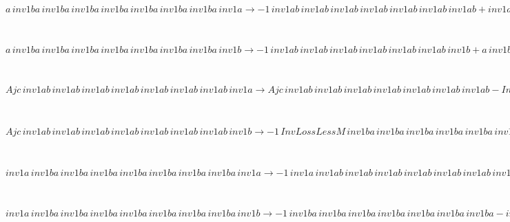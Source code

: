 \documentclass[rep10,leqno]{report}
\begin{document}
\begin{minipage}{6in}
$
a\,
 inv1ba\,
 inv1ba\,
 inv1ba\,
 inv1ba\,
 inv1ba\,
 inv1ba\,
 inv1ba\,
 inv1a\rightarrow -1\,
 inv1ab\,
 inv1ab\,
 inv1ab\,
 inv1ab\,
 inv1ab\,
 inv1ab\,
 inv1ab + inv1ab\,
 inv1ab\,
 inv1ab\,
 inv1ab\,
 inv1ab\,
 inv1ab\,
 inv1ab\,
 inv1a
$
\end{minipage}\medskip \\
\begin{minipage}{6in}
$
a\,
 inv1ba\,
 inv1ba\,
 inv1ba\,
 inv1ba\,
 inv1ba\,
 inv1ba\,
 inv1ba\,
 inv1b\rightarrow -1\,
 inv1ab\,
 inv1ab\,
 inv1ab\,
 inv1ab\,
 inv1ab\,
 inv1ab\,
 inv1b + a\,
 inv1ba\,
 inv1ba\,
 inv1ba\,
 inv1ba\,
 inv1ba\,
 inv1ba\,
 inv1ba + inv1ab\,
 inv1ab\,
 inv1ab\,
 inv1ab\,
 inv1ab\,
 inv1ab\,
 inv1ab\,
 inv1b
$
\end{minipage}\medskip \\
\begin{minipage}{6in}
$
Ajc\,
 inv1ab\,
 inv1ab\,
 inv1ab\,
 inv1ab\,
 inv1ab\,
 inv1ab\,
 inv1ab\,
 inv1a\rightarrow Ajc\,
 inv1ab\,
 inv1ab\,
 inv1ab\,
 inv1ab\,
 inv1ab\,
 inv1ab\,
 inv1ab - InvLossLessM\,
 inv1ba\,
 inv1ba\,
 inv1ba\,
 inv1ba\,
 inv1ba\,
 inv1ba\,
 inv1a + InvLossLessM\,
 inv1ba\,
 inv1ba\,
 inv1ba\,
 inv1ba\,
 inv1ba\,
 inv1ba\,
 inv1ba\,
 inv1a
$
\end{minipage}\medskip \\
\begin{minipage}{6in}
$
Ajc\,
 inv1ab\,
 inv1ab\,
 inv1ab\,
 inv1ab\,
 inv1ab\,
 inv1ab\,
 inv1ab\,
 inv1b\rightarrow -1\,
 InvLossLessM\,
 inv1ba\,
 inv1ba\,
 inv1ba\,
 inv1ba\,
 inv1ba\,
 inv1ba\,
 inv1ba + InvLossLessM\,
 inv1ba\,
 inv1ba\,
 inv1ba\,
 inv1ba\,
 inv1ba\,
 inv1ba\,
 inv1ba\,
 inv1b
$
\end{minipage}\medskip \\
\begin{minipage}{6in}
$
inv1a\,
 inv1ba\,
 inv1ba\,
 inv1ba\,
 inv1ba\,
 inv1ba\,
 inv1ba\,
 inv1ba\,
 inv1a\rightarrow -1\,
 inv1a\,
 inv1ab\,
 inv1ab\,
 inv1ab\,
 inv1ab\,
 inv1ab\,
 inv1ab\,
 inv1ab + inv1ba\,
 inv1ba\,
 inv1ba\,
 inv1ba\,
 inv1ba\,
 inv1ba\,
 inv1ba\,
 inv1a + inv1a\,
 inv1ab\,
 inv1ab\,
 inv1ab\,
 inv1ab\,
 inv1ab\,
 inv1ab\,
 inv1ab\,
 inv1a
$
\end{minipage}\medskip \\
\begin{minipage}{6in}
$
inv1a\,
 inv1ba\,
 inv1ba\,
 inv1ba\,
 inv1ba\,
 inv1ba\,
 inv1ba\,
 inv1ba\,
 inv1b\rightarrow -1\,
 inv1ba\,
 inv1ba\,
 inv1ba\,
 inv1ba\,
 inv1ba\,
 inv1ba\,
 inv1ba - inv1a\,
 inv1ab\,
 inv1ab\,
 inv1ab\,
 inv1ab\,
 inv1ab\,
 inv1ab\,
 inv1b + inv1a\,
 inv1ba\,
 inv1ba\,
 inv1ba\,
 inv1ba\,
 inv1ba\,
 inv1ba\,
 inv1ba + inv1ba\,
 inv1ba\,
 inv1ba\,
 inv1ba\,
 inv1ba\,
 inv1ba\,
 inv1ba\,
 inv1b + inv1a\,
 inv1ab\,
 inv1ab\,
 inv1ab\,
 inv1ab\,
 inv1ab\,
 inv1ab\,
 inv1ab\,
 inv1b
$
\end{minipage}\medskip \\
\end{document}
